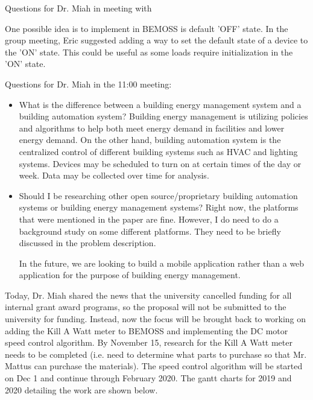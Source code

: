 \documentclass[fontsize=11pt, %
                             paper=letter, %
                             twoside, %
                             captions=tableheading,
                             index=totoc,
                             hyperref]{labbook}
\begin{document}
\begin{addmargin}[0cm]{0cm}
Questions for Dr. Miah in meeting with 

One possible idea is to implement in BEMOSS is default 'OFF' state.
In the group meeting, Eric suggested adding a way to set the default state of a device to the 'ON' state. This could be useful as some loads require initialization in the 'ON' state.

Questions for Dr. Miah in the 11:00 meeting:
\begin{itemize}
\item What is the difference between a building energy management system and a building automation system?
Building energy management is utilizing policies and algorithms to help both meet energy demand in facilities and lower energy demand. On the other hand, building automation system is the centralized control of different building systems such as HVAC and lighting systems. Devices may be scheduled to turn on at certain times of the day or week. Data may be collected over time for analysis.
\item Should I be researching other open source/proprietary building automation systems or building energy management systems?
Right now, the platforms that were mentioned in the paper are fine. However, I do need to do a background study on some different platforms. They need to be briefly discussed in the problem description.

In the future, we are looking to build a mobile application rather than a web application for the purpose of building energy management. 
\end{itemize}
 
Today, Dr. Miah shared the news that the university cancelled funding for all internal grant award programs, so the proposal will not be submitted to the university for funding. Instead, now the focus will be brought back to working on adding the Kill A Watt meter to BEMOSS and implementing the DC motor speed control algorithm. By November 15, research for the Kill A Watt meter needs to be completed (i.e. need to determine what parts to purchase so that Mr. Mattus can purchase the materials). The speed control algorithm will be started on Dec 1 and continue through February 2020. The gantt charts for 2019 and 2020 detailing the work are shown below.


\end{addmargin}
\end{document}
